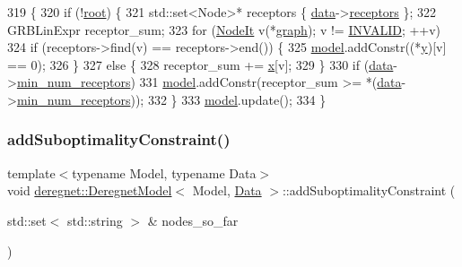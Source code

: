 \begin{DoxyCode}
319                                                                       \{
320     \textcolor{keywordflow}{if} (!\hyperlink{classderegnet_1_1DeregnetModel_a54b20393a0e26d65935d387685d7fe96}{root}) \{
321         std::set<Node>* receptors \{ \hyperlink{classderegnet_1_1DeregnetModel_ad5399761cf6293a702f3800bda4806d1}{data}->\hyperlink{classderegnet_1_1DeregnetData_a470cc9f84741c59897ab1e7a3daa1205}{receptors} \};
322         GRBLinExpr receptor\_sum;
323         \textcolor{keywordflow}{for} (\hyperlink{namespacederegnet_ac34314e1b5f456fc6d1bb9d96316de4a}{NodeIt} v(*\hyperlink{classderegnet_1_1DeregnetModel_a3cd2f54b8e061ef5bed32708d9bc1ef1}{graph}); v != \hyperlink{usinglemon_8hpp_adf770fe2eec438e3758ffe905dbae208}{INVALID}; ++v)
324             \textcolor{keywordflow}{if} (receptors->find(v) == receptors->end()) \{
325                 \hyperlink{classderegnet_1_1DeregnetModel_a30d525de2086e342b33fe3e45ede4947}{model}.addConstr((*\hyperlink{classderegnet_1_1DeregnetModel_ae76df61afe302b939165facf3dd21ac8}{y})[v] == 0);   
326             \}
327             \textcolor{keywordflow}{else} \{
328                 receptor\_sum += \hyperlink{classderegnet_1_1DeregnetModel_a360c980f3fec4dfbab50e9bb06a933a8}{x}[v];
329             \}
330         \textcolor{keywordflow}{if} (\hyperlink{classderegnet_1_1DeregnetModel_ad5399761cf6293a702f3800bda4806d1}{data}->\hyperlink{classderegnet_1_1AvgdrgntData_a908acb714a65fd9ec4c278fa08150d96}{min\_num\_receptors})
331             \hyperlink{classderegnet_1_1DeregnetModel_a30d525de2086e342b33fe3e45ede4947}{model}.addConstr(receptor\_sum >= *(\hyperlink{classderegnet_1_1DeregnetModel_ad5399761cf6293a702f3800bda4806d1}{data}->\hyperlink{classderegnet_1_1AvgdrgntData_a908acb714a65fd9ec4c278fa08150d96}{min\_num\_receptors}));
332     \}
333     \hyperlink{classderegnet_1_1DeregnetModel_a30d525de2086e342b33fe3e45ede4947}{model}.update();
334 \}
\end{DoxyCode}
\mbox{\label{classderegnet_1_1DeregnetModel_a7cac8e5496b44f04ecf7ff9e450e9a6e}} 
\subsubsection{\texorpdfstring{add\+Suboptimality\+Constraint()}{addSuboptimalityConstraint()}\hspace{0.1cm}{\footnotesize\ttfamily [1/3]}}
{\footnotesize\ttfamily template$<$typename Model, typename Data$>$ \\
void \hyperlink{classderegnet_1_1DeregnetModel}{deregnet\+::\+Deregnet\+Model}$<$ Model, \hyperlink{avgdrgnt_8cpp_a1d1235306db276e9b36acba1db1509e8}{Data} $>$\+::add\+Suboptimality\+Constraint (\begin{DoxyParamCaption}\item[{std\+::set$<$ std\+::string $>$ \&}]{nodes\+\_\+so\+\_\+far }\end{DoxyParamCaption})}


